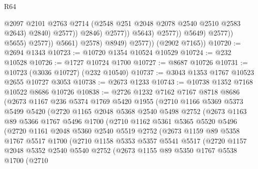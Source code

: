 \begin{lexlean}{R64}
\begin{coremodule}
                                              @2097
                                              @2101
                                              @2763
                                              @2714
                                              (@2548 @251 @2048 @2078 @2540 @2510 @2583 @2643)
                                              @2840)
                                            @2577))
                                        @2846)
                                      @2577))
                                  @5643)
                                @2577))
                            @5649)
                          @2577))
                      @5655)
                    @2577))
                @5661)
              @2578)
            @8949)
          @2577))
      (@2902 @7165))
@10720 := @2694 @1343
@10723 := @10720 @1354 @10524 @10529
@10724 := @232 @10528
@10726 := @1727 @10724 @1700
@10727 := @8687 @10726
@10731 := @10723 (@3036 @10727) (@232 @10540)
@10737 := @3043 @1353 @1767 @10523 @2655 @10727 @3053
@10738 := @2673 @1233
@10743 := @10738 @1352 @7168 @10522 @8686 @10726
@10838 := @2726
    @1232
    @7162
    @7167
    @8718
    @8686
    (@2673
      @1167
      @236
      @5374
      @1769
      @5420
      @1955
      (@2710
        @1166
        @5369
        @5373
        @5499
        @5420
        (@2720
          @1165
          @2048
          @5368
          @2540
          @5498
          @2752
          (@2673
            @1163
            @89
            @5366
            @1767
            @5496
            @1700
            (@2710
              @1162
              @5361
              @5365
              @5520
              @5496
              (@2720
                @1161
                @2048
                @5360
                @2540
                @5519
                @2752
                (@2673
                  @1159
                  @89
                  @5358
                  @1767
                  @5517
                  @1700
                  (@2710
                    @1158
                    @5353
                    @5357
                    @5541
                    @5517
                    (@2720
                      @1157
                      @2048
                      @5352
                      @2540
                      @5540
                      @2752
                      (@2673
                        @1155
                        @89
                        @5350
                        @1767
                        @5538
                        @1700
                        (@2710

\end{coremodule}
\end{lexlean}
